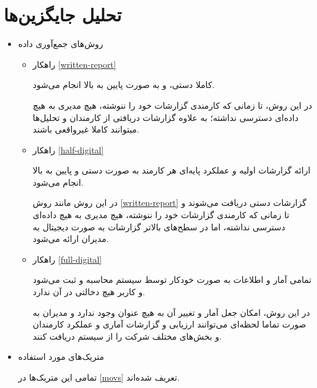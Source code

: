 \documentclass[12pt]{article}
\begin{document}
\section{تحلیل جایگزین‌ها}


\begin{itemize}
\item         
روش‌های جمع‌آوری داده

\begin{itemize}
    \item راهکار \ref{written-report} 
    
    کاملا دستی، و به صورت پایین به بالا انجام می‌شود.
  
  در این روش، تا زمانی که کارمندی گزارشات خود را ننوشته، هیچ مدیری به هیچ داده‌ای دسترسی نداشته؛ به علاوه گزارشات دریافتی از کارمندان و تحلیل‌ها میتوانند کاملا غیرواقعی‌ باشند.
    \item راهکار \ref{half-digital}
    
    ارائه گزارشات اولیه و عملکرد پایه‌ای هر کارمند به صورت دستی و پایین به بالا انجام می‌شود.
    
    در این روش مانند روش \ref{written-report} گزارشات دستی دریافت می‌شوند و تا زمانی که کارمندی گزارشات خود را ننوشته، هیچ مدیری به هیچ داده‌ای دسترسی نداشته، اما در سطح‌های بالاتر گزارشات به صورت دیجیتال به مدیران ارائه می‌شود.
    
    \item راهکار \ref{full-digital}
    
    تمامی آمار و اطلاعات به صورت خودکار توسط سیستم محاسبه و ثبت می‌شود و کاربر هیچ دخالتی در آن ندارد.
    
    در این روش، امکان جعل آمار و تغییر آن به هیچ عنوان وجود ندارد و مدیران به صورت تماما لحظه‌ای می‌توانند ارزیابی و گزارشات آماری و عملکرد کارمندان و بخش‌های مختلف شرکت را از سیستم دریافت کنند.
\end{itemize}
\item         
متریک‌های مورد استفاده

تمامی این متریک‌ها در \ref{movs} تعریف شده‌اند.
\end{itemize}
\end{document}
